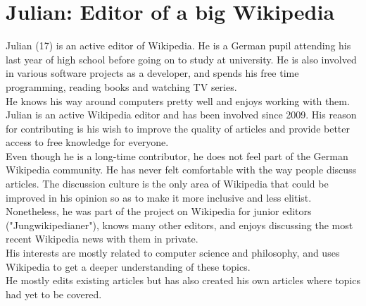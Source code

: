 \section{Julian: Editor of a big Wikipedia}
Julian (17) is an active editor of Wikipedia. He is a German pupil attending his last year of high school before going on to study at university. He is also involved in various software projects as a developer,  and spends his free time programming, reading books and watching TV series. \\
He knows his way around computers pretty well and enjoys working with them. \\
Julian is an active Wikipedia editor and has been involved since 2009. His reason for contributing is his wish to improve the quality of articles and provide better access to free knowledge for everyone. \\
Even though he is a long-time contributor, he does not feel part of the German Wikipedia community. He has never felt comfortable with the way people discuss articles. The discussion culture is the only area of Wikipedia that could be improved in his opinion so as to make it more inclusive and less elitist. \\
Nonetheless, he was part of the project on Wikipedia for junior editors ("Jungwikipedianer"), knows many other editors, and enjoys discussing the most recent Wikipedia news with them in private. \\
His interests are mostly related to computer science and philosophy, and uses Wikipedia to get a deeper understanding of these topics. \\
He mostly edits existing articles but has also created his own articles where topics had yet to be covered.

